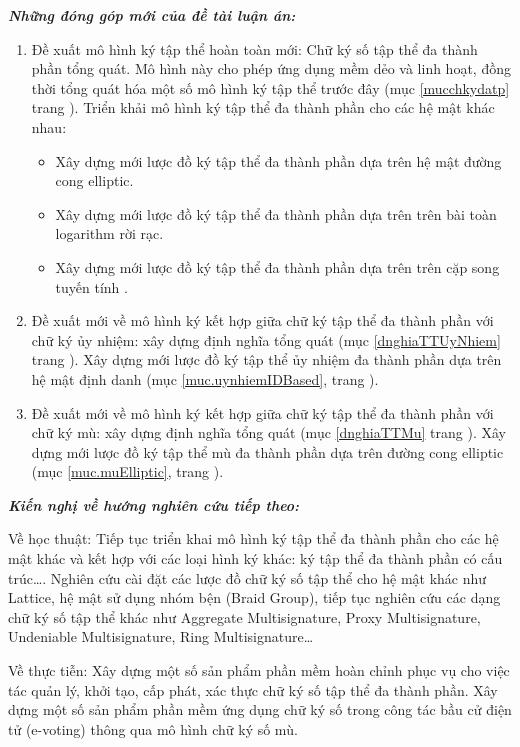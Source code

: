 \textit{\textbf{Những đóng góp mới của đề tài luận án:}}
\begin{enumerate}[label=(\arabic*)]
	\item Đề xuất mô hình ký tập thể hoàn toàn mới: Chữ ký số tập thể đa thành phần tổng quát. Mô hình này cho phép ứng dụng mềm dẻo và linh hoạt, đồng thời tổng quát hóa một số mô hình ký tập thể trước đây (mục \ref{mucchkydatp} trang \pageref{mucchkydatp}). Triển khải mô hình ký tập thể đa thành phần cho các hệ mật khác nhau:
	\begin{itemize}
		\item Xây dựng mới lược đồ ký tập thể đa thành phần dựa trên hệ mật đường cong elliptic.
		\item Xây dựng mới lược đồ ký tập thể đa thành phần dựa trên trên bài toàn logarithm rời rạc.
		\item Xây dựng mới lược đồ ký tập thể đa thành phần dựa trên trên cặp song tuyến tính .
	\end{itemize}
	  
	\item Đề xuất mới về mô hình ký kết hợp giữa chữ ký tập thể đa thành phần với chữ ký ủy nhiệm: xây dựng định nghĩa tổng quát  (mục \ref{dnghiaTTUyNhiem} trang \pageref{dnghiaTTUyNhiem}). Xây dựng mới lược đồ ký tập thể ủy nhiệm đa thành phần dựa trên hệ mật định danh (mục \ref{muc.uynhiemIDBased}, trang \pageref{muc.uynhiemIDBased}).
	\item Đề xuất mới về mô hình ký kết hợp giữa chữ ký tập thể đa thành phần với chữ ký mù: xây dựng định nghĩa tổng quát (mục \ref{dnghiaTTMu} trang \pageref{dnghiaTTMu}). Xây dựng mới lược đồ ký tập thể mù đa thành phần dựa trên đường cong elliptic (mục \ref{muc.muElliptic}, trang \pageref{muc.muElliptic}). 
\end{enumerate}

\textbf{\textit{Kiến nghị về hướng nghiên cứu tiếp theo:}}

Về học thuật: Tiếp tục triển khai mô hình ký tập thể đa thành phần cho các hệ mật khác và kết hợp với các loại hình ký khác: ký tập thể đa thành phần có cấu trúc\ldots. Nghiên cứu cài đặt các lược đồ chữ ký số tập thể cho hệ mật khác như Lattice, hệ mật sử dụng nhóm bện (Braid Group), tiếp tục nghiên cứu các dạng chữ ký số tập thể khác như Aggregate Multisignature, Proxy Multisignature, Undeniable Multisignature, Ring Multisignature\ldots

Về thực tiễn: Xây dựng một số sản phẩm phần mềm hoàn chỉnh phục vụ cho việc tác quản lý, khởi tạo, cấp phát, xác thực chữ ký số tập thể đa thành phần. Xây dựng một số sản phẩm phần mềm ứng dụng chữ ký số trong công tác bầu cử điện tử (e-voting) thông qua mô hình chữ ký số mù.
 
